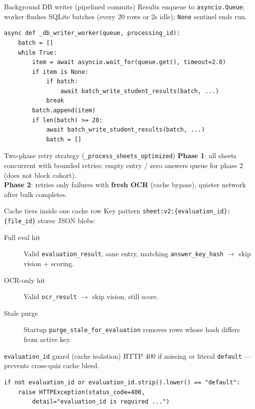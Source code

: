 \documentclass[aspectratio=169]{beamer}
\begin{document}
\begin{frame}[fragile]{Background DB writer (pipelined commits)}
  \footnotesize
  Results enqueue to \texttt{asyncio.Queue}; worker flushes SQLite batches (every 20 rows or 2s idle); \texttt{None} sentinel ends run.
\begin{lstlisting}[style=py]
async def _db_writer_worker(queue, processing_id):
    batch = []
    while True:
        item = await asyncio.wait_for(queue.get(), timeout=2.0)
        if item is None:
            if batch:
                await batch_write_student_results(batch, ...)
            break
        batch.append(item)
        if len(batch) >= 20:
            await batch_write_student_results(batch, ...)
            batch = []
\end{lstlisting}
\end{frame}

\begin{frame}{Two-phase retry strategy (\texttt{\_process\_sheets\_optimized})}
  \small
  \textbf{Phase 1}: all sheets concurrent with bounded retries; empty entry / zero answers queue for phase 2 (does not block cohort).\\
  \textbf{Phase 2}: retries only failures with \textbf{fresh OCR} (cache bypass), quieter network after bulk completes.
\end{frame}

\begin{frame}{Cache tiers inside one cache row}
  \small
  Key pattern \texttt{sheet:v2:\{evaluation\_id\}:\{file\_id\}} stores JSON blobs:\\[0.4em]
  \begin{description}
    \item[Full eval hit] Valid \texttt{evaluation\_result}, sane entry, matching \texttt{answer\_key\_hash} $\rightarrow$ skip vision + scoring.
    \item[OCR-only hit] Valid \texttt{ocr\_result} $\rightarrow$ skip vision, still score.
    \item[Stale purge] Startup \texttt{purge\_stale\_for\_evaluation} removes rows whose hash differs from active key.
  \end{description}
\end{frame}

\begin{frame}[fragile]{\texttt{evaluation\_id} guard (cache isolation)}
  \footnotesize
  HTTP 400 if missing or literal \texttt{default} --- prevents cross-quiz cache bleed.
\begin{lstlisting}[style=py]
if not evaluation_id or evaluation_id.strip().lower() == "default":
    raise HTTPException(status_code=400,
        detail="evaluation_id is required ...")
\end{lstlisting}
\end{frame}
\end{document}
